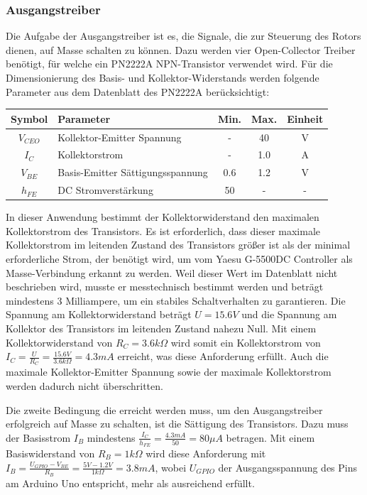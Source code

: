 \subsubsection{Ausgangstreiber}
Die Aufgabe der Ausgangstreiber ist es, die Signale, die zur Steuerung des Rotors dienen, auf Masse schalten zu können. Dazu werden vier Open-Collector Treiber benötigt, für welche ein PN2222A NPN-Transistor verwendet wird. Für die Dimensionierung des Basis- und Kollektor-Widerstands werden folgende Parameter aus dem Datenblatt des PN2222A \cite{noauthor_pn2222a_nodate} berücksichtigt: 
\begin{table}[H]
	\centering
	\begin{tabular}{| c | l | c | c | c |}
		\hline
		\textbf{Symbol} & \textbf{Parameter} & \textbf{Min.} & \textbf{Max.} & \textbf{Einheit} \\
		\hline
		${V}_{CEO}$ & Kollektor-Emitter Spannung & - & 40 & V \\
		\hline
		${I}_{C}$ & Kollektorstrom & - & 1.0 & A \\
		\hline
		${V}_{BE}$ & Basis-Emitter Sättigungsspannung & 0.6 & 1.2 & V \\
		\hline
		${h}_{FE}$ & DC Stromverstärkung & 50 & - & - \\
		\hline
	\end{tabular}
\end{table}

In dieser Anwendung bestimmt der Kollektorwiderstand den maximalen Kollektorstrom des Transistors. Es ist erforderlich, dass dieser maximale Kollektorstrom im leitenden Zustand des Transistors größer ist als der minimal erforderliche Strom, der benötigt wird, um vom Yaesu G-5500DC Controller als Masse-Verbindung erkannt zu werden. Weil dieser Wert im Datenblatt \cite{noauthor_yaesu_nodate} nicht beschrieben wird, musste er messtechnisch bestimmt werden und beträgt mindestens 3 Milliampere, um ein stabiles Schaltverhalten zu garantieren. Die Spannung am Kollektorwiderstand beträgt $U=15.6V$ und die Spannung am Kollektor des Transistors im leitenden Zustand nahezu Null. Mit einem Kollektorwiderstand von $R_C=3.6k\Omega$ wird somit ein Kollektorstrom von $I_C=\frac{U}{R_C}=\frac{15.6V}{3.6k\Omega}=4.3mA$ erreicht, was diese Anforderung erfüllt. Auch die maximale Kollektor-Emitter Spannung sowie der maximale Kollektorstrom werden dadurch nicht überschritten. 

Die zweite Bedingung die erreicht werden muss, um den Ausgangstreiber erfolgreich auf Masse zu schalten, ist die Sättigung des Transistors. Dazu muss der Basisstrom $I_B$ mindestens $\frac{I_C}{h_{FE}}=\frac{4.3mA}{50}=80\mu A$ betragen. Mit einem Basiswiderstand von $R_B=1k\Omega$ wird diese Anforderung mit $I_B=\frac{U_{GPIO}-V_{BE}}{R_B}=\frac{5V-1.2V}{1k\Omega}=3.8mA$, wobei $U_{GPIO}$ der Ausgangsspannung des Pins am Arduino Uno \cite{noauthor_r3_nodate} entspricht, mehr als ausreichend erfüllt. 

